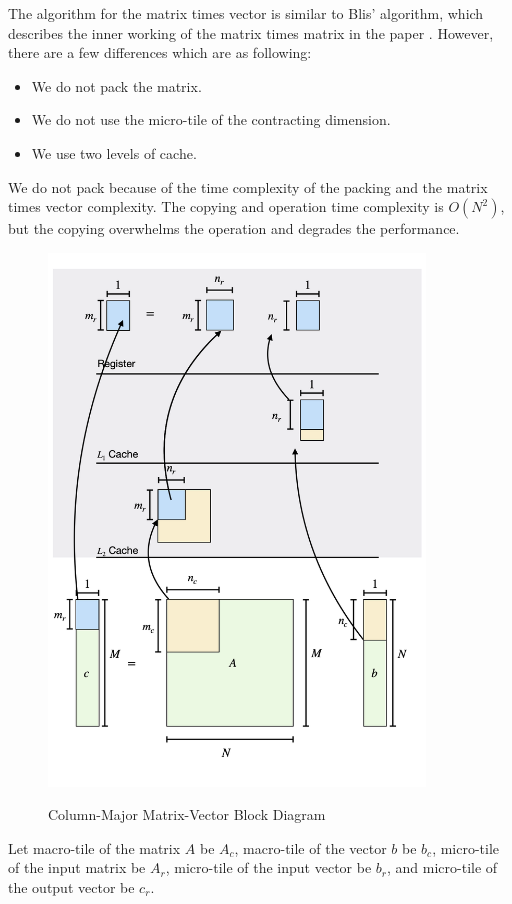 The algorithm for the matrix times vector is similar to Blis' algorithm, 
which describes the inner working of the matrix times matrix in the paper \cite{BLIS}. 
However, there are a few differences which are as following:
\begin{itemize}
    \item We do not pack the matrix.
    \item We do not use the micro-tile of the contracting dimension.
    \item We use two levels of cache.
\end{itemize}

We do not pack because of the time complexity of the packing and the matrix times vector 
complexity. The copying and operation time complexity is $O(N^2)$, but the copying overwhelms 
the operation and degrades the performance.

\begin{figure}[htb]
    \centering
    \caption{Column-Major Matrix-Vector Block Diagram}
    \includegraphics[width=10cm]{../assets/mtv/col_major/block_diagram.png} %
    \label{fig:mtv_col_block_diagram}
\end{figure}

Let macro-tile of the matrix $A$ be $A_c$, 
macro-tile of the vector $b$ be $b_c$, 
micro-tile of the input matrix be $A_r$, 
micro-tile of the input vector be $b_r$, and 
micro-tile of the output vector be $c_r$.

